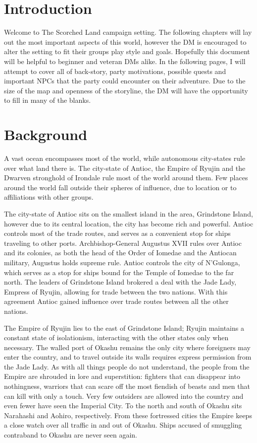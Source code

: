 \section{Introduction}

Welcome to The Scorched Land campaign setting.  The following chapters will lay 
out the most important aspects of this world, however the DM is encouraged to 
alter the setting to fit their groups play style and goals.  Hopefully this document
will be helpful to beginner and veteran DMs alike.  In the following pages, I will 
attempt to cover all of back-story, party motivations, possible quests and important
NPCs that the party could encounter on their adventure.  Due to the size of the 
map and openness of the storyline, the DM will have the opportunity to fill in 
many of the blanks.

\section{Background}

A vast ocean encompasses most of the world, while autonomous city-states rule over
what land there is.  The city-state of Antioc, the Empire of Ryujin and the Dwarven
stronghold of Irondale rule most of the world around them.  Few places around the 
world fall outside their spheres of influence, due to location or to affiliations 
with other groups.

The city-state of Antioc sits on the smallest island in the area, Grindstone Island,
however due to its central location, the city has become rich and powerful.  Antioc
controls most of the trade routes, and serves as a convenient stop for ships 
traveling to other ports.  Archbishop-General Augustus XVII rules over Antioc and 
its colonies, as both the head of the Order of Iomedae and the Antiocan military,
Augustus holds supreme rule.  Antioc controls the city of N'Gulonga, which serves 
as a stop for ships bound for the Temple of Iomedae to the far north.  The leaders 
of Grindstone Island brokered a deal with the Jade Lady, Empress of Ryujin, allowing
for trade between the two nations.  With this agreement Antioc gained influence 
over trade routes between all the other nations.

The Empire of Ryujin lies to the east of Grindstone Island; Ryujin maintains a
constant state of isolationism, interacting with the other states only when
necessary.  The walled port of Okashu remains the only city where foreigners may
enter the country, and to travel outside its walls requires express permission 
from the Jade Lady.  As with all things people do not understand, the people
from the Empire are shrouded in lore and superstition: fighters that can disappear 
into nothingness, warriors that can scare off the most fiendish of beasts and
men that can kill with only a touch.  Very few outsiders are allowed into the 
country and even fewer have seen the Imperial City.  To the north and south of 
Okashu sits Narahashi and Aohiro, respectively.  From these fortressed cities the 
Empire keeps a close watch over all traffic in and out of Okashu.  Ships accused
of smuggling contraband to Okashu are never seen again.  

